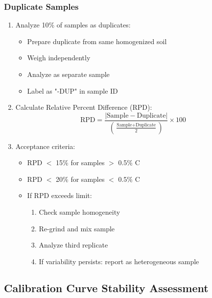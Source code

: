 \documentclass[11pt,a4paper]{article}\usepackage[]{graphicx}\usepackage[]{xcolor}
\begin{document}
\subsubsection{Duplicate Samples}
\begin{enumerate}[noitemsep]
    \item Analyze 10\% of samples as duplicates:
    \begin{itemize}
        \item Prepare duplicate from same homogenized soil
        \item Weigh independently
        \item Analyze as separate sample
        \item Label as "-DUP" in sample ID
    \end{itemize}
    \item Calculate Relative Percent Difference (RPD):
    \begin{equation}
    \text{RPD} = \frac{|\text{Sample} - \text{Duplicate}|}{\left(\frac{\text{Sample} + \text{Duplicate}}{2}\right)} \times 100
    \end{equation}
    \item Acceptance criteria:
    \begin{itemize}
        \item RPD $<$ 15\% for samples $>$ 0.5\% C
        \item RPD $<$ 20\% for samples $<$ 0.5\% C
        \item If RPD exceeds limit:
        \begin{enumerate}
            \item Check sample homogeneity
            \item Re-grind and mix sample
            \item Analyze third replicate
            \item If variability persists: report as heterogeneous sample
        \end{enumerate}
    \end{itemize}
\end{enumerate}

\subsection{Calibration Curve Stability Assessment}
\end{document}
